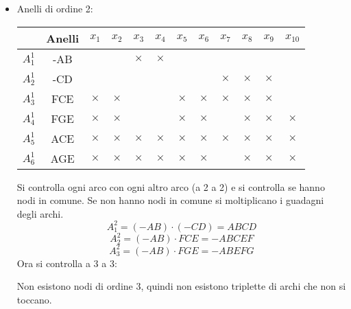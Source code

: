 \documentclass[a4paper]{article}
\begin{document}
\begin{example}
\begin{enumerate}
\begin{itemize}
        \item Anelli di ordine 2:
          \begin{table}[H]
            \centering
            \bgroup
            \def\arraystretch{1.5}
            \begin{tabular}{|c|c|c|c|c|c|c|c|c|c|c|c|}
              \hline
              & Anelli & \( x_1 \) & \( x_2 \) & \( x_3 \) & \( x_4 \) & \( x_5 \) & \( x_6 \) & \( x_7 \) & \( x_8 \) & \( x_9 \) & \( x_{10} \) \\
              \hline
              \( A_1^1 \) & -AB & & &$\times$&$\times$& & & & & & \\ 
              \hline
              \( A_2^1 \) & -CD & & & & & & &$\times$&$\times$&$\times$& \\
              \hline
              \( A_3^1 \) & FCE &$\times$&$\times$& & &$\times$&$\times$&$\times$&$\times$&$\times$& \\
              \hline
              \( A_4^1 \) & FGE &$\times$&$\times$& & &$\times$&$\times$& &$\times$&$\times$&$\times$\\
              \hline
              \( A_5^1 \) & ACE &$\times$&$\times$&$\times$&$\times$&$\times$&$\times$&$\times$&$\times$&$\times$&$\times$\\
              \hline
              \( A_6^1 \) & AGE &$\times$&$\times$&$\times$&$\times$&$\times$&$\times$& &$\times$&$\times$&$\times$\\
              \hline
            \end{tabular}
            \egroup
          \end{table}
          Si controlla ogni arco con ogni altro arco (a 2 a 2) e si controlla se hanno
          nodi in comune. Se non hanno nodi in comune si moltiplicano i guadagni
          degli archi.
          \[
          A_1^2 = (-AB) \cdot (-CD) = ABCD
          \] 
          \[
          A_2^2 = (-AB) \cdot FCE = -ABCEF
          \] 
          \[
          A_3^2 = (-AB) \cdot FGE = -ABEFG
          \] 
          Ora si controlla a 3 a 3:

          Non esistono nodi di ordine 3, quindi non esistono triplette di archi che
          non si toccano.
      \end{itemize}


\end{enumerate}
\end{example}
\end{document}
